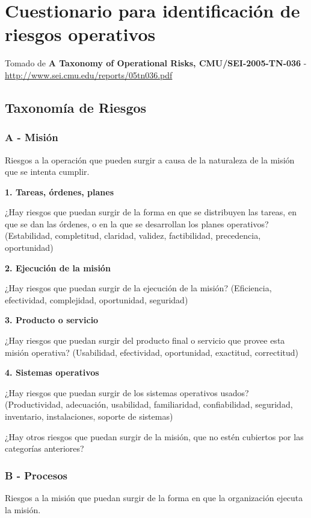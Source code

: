 \section {Cuestionario para identificación de riesgos operativos}
\label{sec:CuestionarioRiesgos}
Tomado de \textbf{A Taxonomy of Operational Risks, CMU/SEI-2005-TN-036} - \url{http://www.sei.cmu.edu/reports/05tn036.pdf}

\subsection{Taxonomía de Riesgos}

\subsubsection{A - Misión}
Riesgos a la operación que pueden surgir a causa de la naturaleza de la misión que se intenta cumplir.

\textbf{1. Tareas, órdenes, planes}

¿Hay riesgos que puedan surgir de la forma en que se  distribuyen las tareas, en que se dan las órdenes, o en la que se desarrollan los planes operativos? (Estabilidad, completitud, claridad, validez, factibilidad, precedencia, oportunidad)

\textbf{2. Ejecución de la misión}

¿Hay riesgos que puedan surgir de la ejecución de la misión? (Eficiencia, efectividad, complejidad, oportunidad, seguridad)

\textbf{3. Producto o servicio}

¿Hay riesgos que puedan surgir del producto final o servicio que provee esta misión operativa? (Usabilidad, efectividad, oportunidad, exactitud, correctitud) 

\textbf{4. Sistemas operativos}

¿Hay riesgos que puedan surgir de los sistemas operativos usados? (Productividad, adecuación, usabilidad, familiaridad, confiabilidad, seguridad, inventario, instalaciones, soporte de sistemas)

¿Hay otros riesgos que puedan surgir de la misión, que no estén cubiertos por las categorías anteriores?


\subsubsection{B - Procesos}
Riesgos a la misión que puedan surgir de la forma en que la organización ejecuta la misión.

